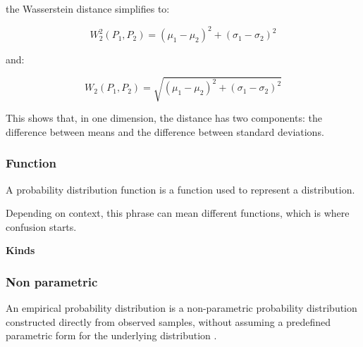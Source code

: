 \documentclass{book}
\providecommand{\ProjectDeepHeading}[2]{%
    \par\medskip\noindent\textbf{#2}\par\smallskip
}
\begin{document}
        the Wasserstein distance simplifies to:
        
        \[
            W_2^2
            \left(
                P_1,
                P_2
            \right)
            =
            \left(
                \ensuremath{\mu}_1
            -
                \ensuremath{\mu}_2
            \right)^2
            +
            \left(
                \ensuremath{\sigma}_1
            -
                \ensuremath{\sigma}_2
            \right)^2
        \]
        
        and:
        
        \[
            W_2
            \left(
                P_1,
                P_2
            \right)
            =
            \sqrt{
                \left(
                    \ensuremath{\mu}_1
                -
                    \ensuremath{\mu}_2
                \right)^2
                +
                \left(
                    \ensuremath{\sigma}_1
                -
                    \ensuremath{\sigma}_2
                \right)^2
            }
        \]
        
        This shows that, in one dimension, the distance has two components: the difference between means and the difference between standard deviations.

\subsubsection{Function}


A probability distribution function is a function used to represent a distribution.
   
    Depending on context, this phrase can mean different functions, which is where confusion starts.
   
   \ProjectDeepHeading{1}{Kinds}
        \ProjectDeepHeading{2}{}

\subsubsection{Non parametric}


An empirical probability distribution is a non-parametric probability distribution constructed directly from observed samples, without assuming
      a predefined parametric form for the underlying distribution \cite{wasserman-2006-all-of-nonparametric-statistics}.
\end{document}
